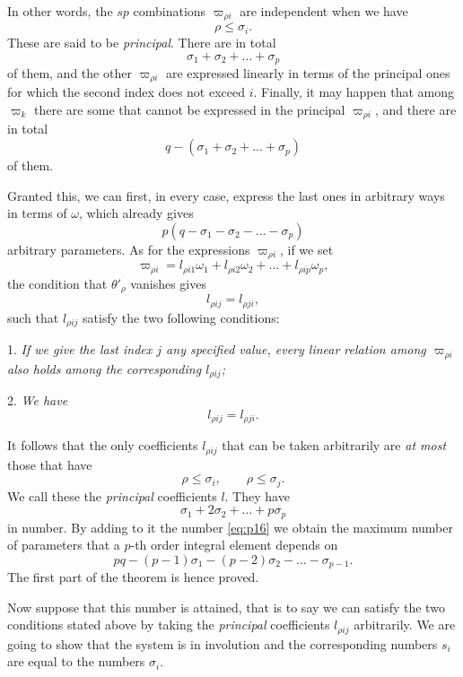\documentclass[leqno,11pt]{book}
\theoremstyle{shape1}
\theoremstyle{shapesmall}
\newcommand{\vp}{\varpi}
\newcommand{\somespace}{\vspace{9pt}}
\begin{document}
In other words, the $sp$ combinations $\vp_{\rho i}$ are independent when we have
\[
\rho\le \sigma_{i}.
\]
These are said to be \emph{principal}. There are in total
\[
\sigma_{1}+\sigma_{2}+\dots+\sigma_{p}
\]
of them, and the other $\vp_{\rho i}$ are expressed linearly in terms of the principal ones for which the second index does not exceed $i$. Finally, it may happen that among $\vp_{k}$ there are some that cannot be expressed in the principal $\vp_{\rho i}$, and there are in total
\[
q-(\sigma_{1}+\sigma_{2}+\dots+\sigma_{p})
\]
of them.

Granted this, we can first, in every case, express the last ones in arbitrary ways in terms of $\omega$, which already gives
\begin{equation}
  \label{eq:p16}
  p(q-\sigma_{1}-\sigma_{2}-\dots-\sigma_{p})
\end{equation}
arbitrary parameters. As for the expressions $\vp_{\rho i}$, if we set
\[
\vp_{\rho i}=l_{\rho i1}\omega_{1}+l_{\rho i2}\omega_{2}+\dots+l_{\rho i p}\omega_{p},
\]
the condition that $\theta'_{\rho}$ vanishes gives
\[
l_{\rho ij}=l_{\rho ji},
\]
such that $l_{\rho ij}$ satisfy the two following conditions:

\somespace

1. \emph{If we give the last index $j$ any specified value, every linear relation among $\vp_{\rho i}$ also holds among the corresponding $l_{\rho ij}$;}

2. \emph{We have}
  \begin{equation}
    \label{eq:p17}
    l_{\rho ij}=l_{\rho ji}.
  \end{equation}

\somespace

It follows that the only coefficients $l_{\rho ij}$ that can be taken arbitrarily are \emph{at most} those that have
\begin{equation}
  \label{eq:p18}
  \rho\le \sigma_{i},\qquad\rho\le \sigma_{j}.
\end{equation}
We call these the \emph{principal} coefficients $l$. They have
\begin{equation}
  \label{eq:p.19}
  \sigma_{1}+2\sigma_{2}+\dots+p\sigma_{p}
\end{equation}
in number. By adding to it the number \eqref{eq:p16} we obtain the maximum number of parameters that a $p$-th order integral element depends on
\[
pq-(p-1)\sigma_{1}-(p-2)\sigma_{2}-\dots-\sigma_{p-1}.
\]
The first part of the theorem is hence proved.

Now suppose that this number is attained, that is to say we can satisfy the two conditions stated above by taking the \emph{principal} coefficients $l_{\rho ij}$ arbitrarily. We are going to show that the system is in involution and the corresponding numbers $s_{i}$ are equal to the numbers $\sigma_{i}$.
\end{document}
